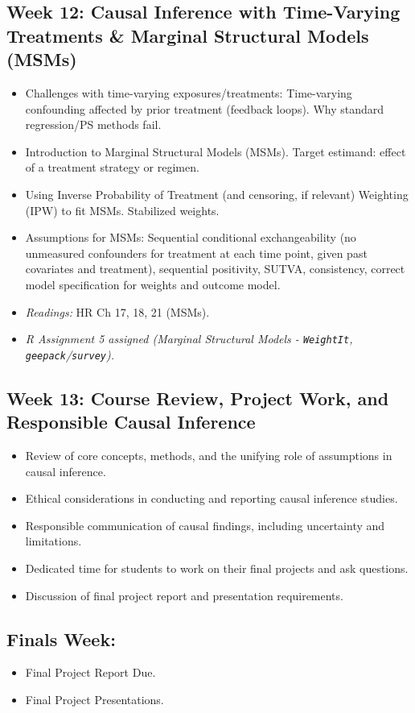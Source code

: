 \documentclass[10.5pt]{article}
\begin{document}
\subsection*{Week 12: Causal Inference with Time-Varying Treatments \& Marginal Structural Models (MSMs)}
\begin{itemize}
    \item Challenges with time-varying exposures/treatments: Time-varying confounding affected by prior treatment (feedback loops). Why standard regression/PS methods fail.
    \item Introduction to Marginal Structural Models (MSMs). Target estimand: effect of a treatment strategy or regimen.
    \item Using Inverse Probability of Treatment (and censoring, if relevant) Weighting (IPW) to fit MSMs. Stabilized weights.
    \item Assumptions for MSMs: Sequential conditional exchangeability (no unmeasured confounders for treatment at each time point, given past covariates and treatment), sequential positivity, SUTVA, consistency, correct model specification for weights and outcome model.
    \item \textit{Readings:} HR Ch 17, 18, 21 (MSMs).
    \item \textit{R Assignment 5 assigned (Marginal Structural Models - \texttt{WeightIt}, \texttt{geepack}/\texttt{survey}).}
\end{itemize}

\subsection*{Week 13: Course Review, Project Work, and Responsible Causal Inference}
\begin{itemize}
    \item Review of core concepts, methods, and the unifying role of assumptions in causal inference.
    \item Ethical considerations in conducting and reporting causal inference studies.
    \item Responsible communication of causal findings, including uncertainty and limitations.
    \item Dedicated time for students to work on their final projects and ask questions.
    \item Discussion of final project report and presentation requirements.
\end{itemize}

\subsection*{Finals Week:}
\begin{itemize}
    \item Final Project Report Due.
    \item Final Project Presentations.
\end{itemize}
\end{document}
